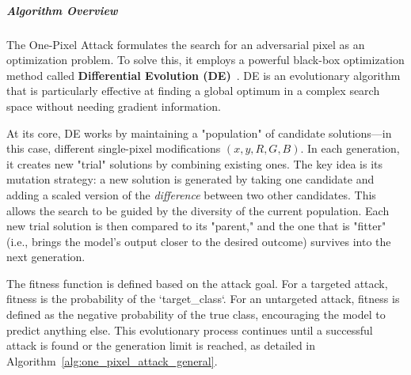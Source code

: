 \documentclass[../main.tex]{subfiles}
\begin{document}
\subparagraph{Algorithm Overview}
The One-Pixel Attack formulates the search for an adversarial pixel as an optimization problem. To solve this, it employs a powerful black-box optimization method called \textbf{Differential Evolution (DE)}~\cite{Storn1997}. DE is an evolutionary algorithm that is particularly effective at finding a global optimum in a complex search space without needing gradient information.

At its core, DE works by maintaining a "population" of candidate solutions—in this case, different single-pixel modifications $(x, y, R, G, B)$. In each generation, it creates new "trial" solutions by combining existing ones. The key idea is its mutation strategy: a new solution is generated by taking one candidate and adding a scaled version of the \textit{difference} between two other candidates. This allows the search to be guided by the diversity of the current population. Each new trial solution is then compared to its "parent," and the one that is "fitter" (i.e., brings the model's output closer to the desired outcome) survives into the next generation.

The fitness function is defined based on the attack goal. For a targeted attack, fitness is the probability of the `target\_class`. For an untargeted attack, fitness is defined as the negative probability of the true class, encouraging the model to predict anything else. This evolutionary process continues until a successful attack is found or the generation limit is reached, as detailed in Algorithm~\ref{alg:one_pixel_attack_general}.
\end{document}
